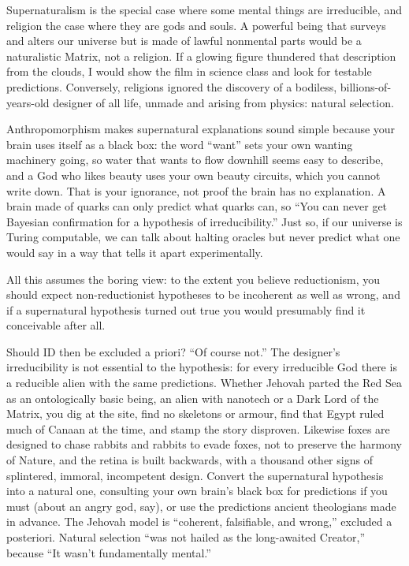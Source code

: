 Supernaturalism is the special case where some mental things are irreducible, and religion the case where they are gods and souls. A powerful being that surveys and alters our universe but is made of lawful nonmental parts would be a naturalistic Matrix, not a religion. If a glowing figure thundered that description from the clouds, I would show the film in science class and look for testable predictions. Conversely, religions ignored the discovery of a bodiless, billions-of-years-old designer of all life, unmade and arising from physics: natural selection.

Anthropomorphism makes supernatural explanations sound simple because your brain uses itself as a black box: the word ``want'' sets your own wanting machinery going, so water that wants to flow downhill seems easy to describe, and a God who likes beauty uses your own beauty circuits, which you cannot write down. That is your ignorance, not proof the brain has no explanation. A brain made of quarks can only predict what quarks can, so ``You can never get Bayesian confirmation for a hypothesis of irreducibility.'' Just so, if our universe is Turing computable, we can talk about halting oracles but never predict what one would say in a way that tells it apart experimentally.

All this assumes the boring view: to the extent you believe reductionism, you should expect non-reductionist hypotheses to be incoherent as well as wrong, and if a supernatural hypothesis turned out true you would presumably find it conceivable after all. 

Should ID then be excluded a priori? ``Of course not.'' The designer's irreducibility is not essential to the hypothesis: for every irreducible God there is a reducible alien with the same predictions. Whether Jehovah parted the Red Sea as an ontologically basic being, an alien with nanotech or a Dark Lord of the Matrix, you dig at the site, find no skeletons or armour, find that Egypt ruled much of Canaan at the time, and stamp the story disproven. Likewise foxes are designed to chase rabbits and rabbits to evade foxes, not to preserve the harmony of Nature, and the retina is built backwards, with a thousand other signs of splintered, immoral, incompetent design. Convert the supernatural hypothesis into a natural one, consulting your own brain's black box for predictions if you must (about an angry god, say), or use the predictions ancient theologians made in advance. The Jehovah model is ``coherent, falsifiable, and wrong,'' excluded a posteriori. Natural selection ``was not hailed as the long-awaited Creator,'' because ``It wasn't fundamentally mental.'' 

